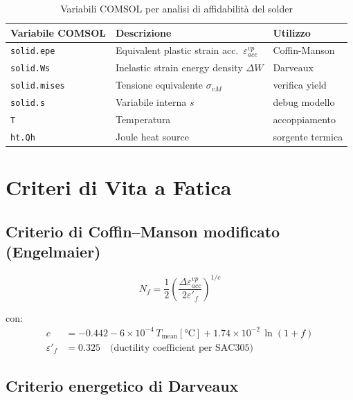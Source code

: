 \documentclass[11pt,a4paper]{article}
\newcommand{\sac}{SAC305}
\begin{document}
\begin{table}[H]
  \centering
  \caption{Variabili COMSOL per analisi di affidabilità del solder}
  \renewcommand{\arraystretch}{1.2}
  \begin{tabular}{lll}
    \toprule
    Variabile COMSOL & Descrizione & Utilizzo \\
    \midrule
    \texttt{solid.epe}   & Equivalent plastic strain acc.\ $\varepsilon^{vp}_{acc}$ & Coffin-Manson \\
    \texttt{solid.Ws}    & Inelastic strain energy density $\Delta W$ & Darveaux \\
    \texttt{solid.mises} & Tensione equivalente $\sigma_{vM}$ & verifica yield \\
    \texttt{solid.s}     & Variabile interna $s$ & debug modello \\
    \texttt{T}           & Temperatura & accoppiamento \\
    \texttt{ht.Qh}       & Joule heat source & sorgente termica \\
    \bottomrule
  \end{tabular}
\end{table}

\section{Criteri di Vita a Fatica}

\subsection{Criterio di Coffin--Manson modificato (Engelmaier)}

\begin{equation}
  N_f = \frac{1}{2}
  \left(\frac{\Delta\varepsilon^{vp}_{acc}}{2\varepsilon'_f}\right)^{1/c}
  \label{eq:coffin}
\end{equation}

con:
\begin{align}
  c &= -0.442 - 6\times10^{-4}\,T_{\mathrm{mean}}[\si{\celsius}]
       + 1.74\times10^{-2}\,\ln(1 + f)
  \label{eq:c_coeff} \\
  \varepsilon'_f &= 0.325 \quad \text{(ductility coefficient per \sac{})}
\end{align}

\subsection{Criterio energetico di Darveaux}
\end{document}
